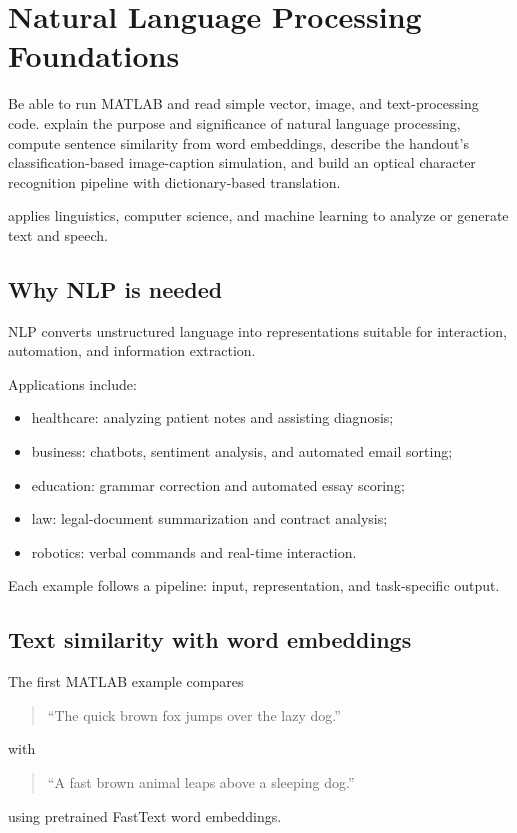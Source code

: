 \chapter{Natural Language Processing Foundations}
\label{ch:nlp-foundations}

\chapterguide%
  {Be able to run MATLAB and read simple vector, image, and text-processing code.}
  {explain the purpose and significance of natural language processing, compute sentence similarity from word embeddings, describe the handout's classification-based image-caption simulation, and build an optical character recognition pipeline with dictionary-based translation.}

 applies linguistics, computer science, and machine learning to analyze or generate text and speech.

\section{Why NLP is needed}

NLP converts unstructured language into representations suitable for interaction, automation, and information extraction.

Applications include:
\begin{itemize}
  \item healthcare: analyzing patient notes and assisting diagnosis;
  \item business: chatbots, sentiment analysis, and automated email sorting;
  \item education: grammar correction and automated essay scoring;
  \item law: legal-document summarization and contract analysis;
  \item robotics: verbal commands and real-time interaction.
\end{itemize}

\begin{keyidea}
Each example follows a pipeline: input, representation, and task-specific output.
\end{keyidea}

\section{Text similarity with word embeddings}

The first MATLAB example compares
\begin{quote}
``The quick brown fox jumps over the lazy dog.''
\end{quote}
with
\begin{quote}
``A fast brown animal leaps above a sleeping dog.''
\end{quote}
using pretrained FastText word embeddings.

